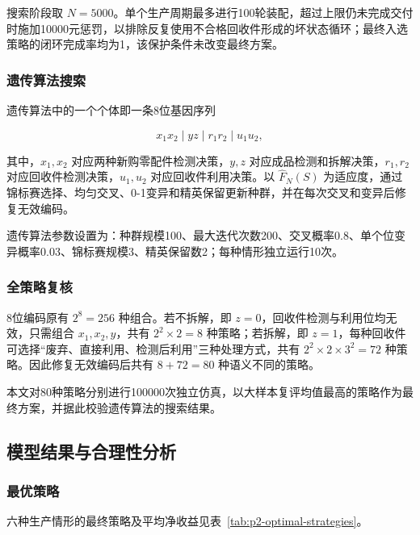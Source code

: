 \documentclass{cumcm}
\numberwithin{figure}{section}
\numberwithin{table}{section}
\begin{document}
搜索阶段取 \(N=5000\)。单个生产周期最多进行100轮装配，超过上限仍未完成交付时施加10000元惩罚，以排除反复使用不合格回收件形成的坏状态循环；最终入选策略的闭环完成率均为1，该保护条件未改变最终方案。

\subsubsection{遗传算法搜索}\label{ux9057ux4f20ux7b97ux6cd5ux641cux7d22}

遗传算法中的一个个体即一条8位基因序列

\[
x_1x_2\mid yz\mid r_1r_2\mid u_1u_2,
\]

其中，\(x_1,x_2\) 对应两种新购零配件检测决策，\(y,z\) 对应成品检测和拆解决策，\(r_1,r_2\) 对应回收件检测决策，\(u_1,u_2\) 对应回收件利用决策。以 \(\widehat F_N(S)\) 为适应度，通过锦标赛选择、均匀交叉、0-1变异和精英保留更新种群，并在每次交叉和变异后修复无效编码。

遗传算法参数设置为：种群规模100、最大迭代次数200、交叉概率0.8、单个位变异概率0.03、锦标赛规模3、精英保留数2；每种情形独立运行10次。

\subsubsection{全策略复核}\label{ux5168ux7b56ux7565ux590dux6838}

8位编码原有 \(2^8=256\) 种组合。若不拆解，即 \(z=0\)，回收件检测与利用位均无效，只需组合 \(x_1,x_2,y\)，共有 \(2^2\times2=8\) 种策略；若拆解，即 \(z=1\)，每种回收件可选择``废弃、直接利用、检测后利用''三种处理方式，共有 \(2^2\times2\times3^2=72\) 种策略。因此修复无效编码后共有 \(8+72=80\) 种语义不同的策略。

本文对80种策略分别进行100000次独立仿真，以大样本复评均值最高的策略作为最终方案，并据此校验遗传算法的搜索结果。

\subsection{模型结果与合理性分析}\label{ux6a21ux578bux7ed3ux679cux4e0eux5408ux7406ux6027ux5206ux6790}

\subsubsection{最优策略}\label{ux6700ux4f18ux7b56ux7565}

六种生产情形的最终策略及平均净收益见表~\ref{tab:p2-optimal-strategies}。
\end{document}
